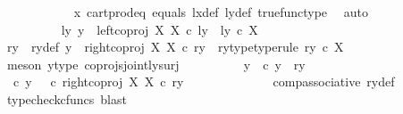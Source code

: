 \begin{isabellebody}
\ \ \ \ \ \ \ \ \ \ \isamarkupfalse%
\ {\isasymrho}x\ cart{\isacharunderscore}{\kern0pt}prod{\isacharunderscore}{\kern0pt}eq{}\ equals\ lx{\isacharunderscore}{\kern0pt}def\ ly{\isacharunderscore}{\kern0pt}def\ true{\isacharunderscore}{\kern0pt}func{\isacharunderscore}{\kern0pt}type\ \isamarkupfalse%
\ auto\isanewline
\ \ \ \ \ \ \isamarkupfalse%
\isanewline
\ \ \ \ \ \ \ \ \isamarkupfalse%
\ {\isachardoublequoteopen}{\isasymnexists}ly{\isachardot}{\kern0pt}\ y\ {\isacharequal}{\kern0pt}\ left{\isacharunderscore}{\kern0pt}coproj\ X\ X\ {\isasymcirc}\isactrlsub c\ ly\ {\isasymand}\ ly\ {\isasymin}\isactrlsub c\ X{\isachardoublequoteclose}\isanewline
\ \ \ \ \ \ \ \ \isamarkupfalse%
\ \isamarkupfalse%
\ ry\ \ ry{\isacharunderscore}{\kern0pt}def{\isacharcolon}{\kern0pt}\ {\isachardoublequoteopen}y\ {\isacharequal}{\kern0pt}\ right{\isacharunderscore}{\kern0pt}coproj\ X\ X\ {\isasymcirc}\isactrlsub c\ ry{\isachardoublequoteclose}\ \ ry{\isacharunderscore}{\kern0pt}type{\isacharbrackleft}{\kern0pt}type{\isacharunderscore}{\kern0pt}rule{\isacharbrackright}{\kern0pt}{\isacharcolon}{\kern0pt}\ {\isachardoublequoteopen}ry\ {\isasymin}\isactrlsub c\ X{\isachardoublequoteclose}\isanewline
\ \ \ \ \ \ \ \ \ \ \isamarkupfalse%
\ {\isacharparenleft}{\kern0pt}meson\ y{\isacharunderscore}{\kern0pt}type\ coprojs{\isacharunderscore}{\kern0pt}jointly{\isacharunderscore}{\kern0pt}surj{\isacharparenright}{\kern0pt}\isanewline
\ \ \ \ \ \ \ \ \isamarkupfalse%
\ {\isasymrho}y{\isacharcolon}{\kern0pt}\ {\isachardoublequoteopen}{\isasymrho}\ {\isasymcirc}\isactrlsub c\ y\ {\isacharequal}{\kern0pt}\ {\isasymlangle}ry{\isacharcomma}{\kern0pt}\ {\isasymf}{\isasymrangle}{\isachardoublequoteclose}\isanewline
\ \ \ \ \ \ \ \ \isamarkupfalse%
\ {\isacharminus}{\kern0pt}\ \isanewline
\ \ \ \ \ \ \ \ \ \ \isamarkupfalse%
\ {\isachardoublequoteopen}{\isasymrho}\ {\isasymcirc}\isactrlsub c\ y\ {\isacharequal}{\kern0pt}\ {\isacharparenleft}{\kern0pt}{\isasymrho}\ {\isasymcirc}\isactrlsub c\ right{\isacharunderscore}{\kern0pt}coproj\ X\ X{\isacharparenright}{\kern0pt}\ {\isasymcirc}\isactrlsub c\ ry{\isachardoublequoteclose}\isanewline
\ \ \ \ \ \ \ \ \ \ \ \ \isamarkupfalse%
\ comp{\isacharunderscore}{\kern0pt}associative{}\ ry{\isacharunderscore}{\kern0pt}def\ \isamarkupfalse%
\ {\isacharparenleft}{\kern0pt}typecheck{\isacharunderscore}{\kern0pt}cfuncs{\isacharcomma}{\kern0pt}\ blast{\isacharparenright}{\kern0pt}\isanewline

\end{isabellebody}
